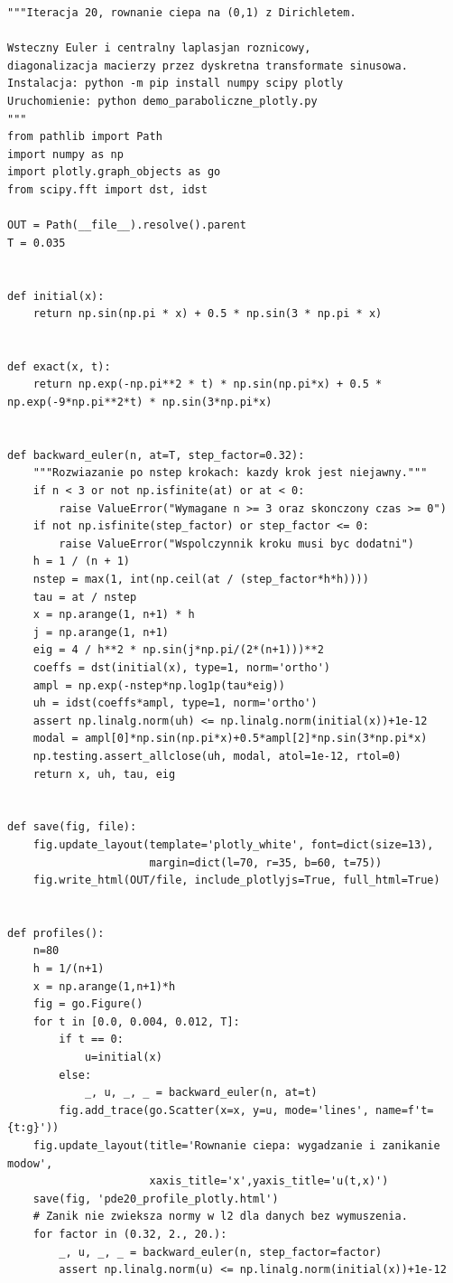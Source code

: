 \begin{lstlisting}[style=pythonpde,caption={Niejawny schemat cieplny, zbieżność i tłumienie modów (Plotly)},label={code:pde20-plotly}]
"""Iteracja 20, rownanie ciepa na (0,1) z Dirichletem.

Wsteczny Euler i centralny laplasjan roznicowy,
diagonalizacja macierzy przez dyskretna transformate sinusowa.
Instalacja: python -m pip install numpy scipy plotly
Uruchomienie: python demo_paraboliczne_plotly.py
"""
from pathlib import Path
import numpy as np
import plotly.graph_objects as go
from scipy.fft import dst, idst

OUT = Path(__file__).resolve().parent
T = 0.035


def initial(x):
    return np.sin(np.pi * x) + 0.5 * np.sin(3 * np.pi * x)


def exact(x, t):
    return np.exp(-np.pi**2 * t) * np.sin(np.pi*x) + 0.5 * np.exp(-9*np.pi**2*t) * np.sin(3*np.pi*x)


def backward_euler(n, at=T, step_factor=0.32):
    """Rozwiazanie po nstep krokach: kazdy krok jest niejawny."""
    if n < 3 or not np.isfinite(at) or at < 0:
        raise ValueError("Wymagane n >= 3 oraz skonczony czas >= 0")
    if not np.isfinite(step_factor) or step_factor <= 0:
        raise ValueError("Wspolczynnik kroku musi byc dodatni")
    h = 1 / (n + 1)
    nstep = max(1, int(np.ceil(at / (step_factor*h*h))))
    tau = at / nstep
    x = np.arange(1, n+1) * h
    j = np.arange(1, n+1)
    eig = 4 / h**2 * np.sin(j*np.pi/(2*(n+1)))**2
    coeffs = dst(initial(x), type=1, norm='ortho')
    ampl = np.exp(-nstep*np.log1p(tau*eig))
    uh = idst(coeffs*ampl, type=1, norm='ortho')
    assert np.linalg.norm(uh) <= np.linalg.norm(initial(x))+1e-12
    modal = ampl[0]*np.sin(np.pi*x)+0.5*ampl[2]*np.sin(3*np.pi*x)
    np.testing.assert_allclose(uh, modal, atol=1e-12, rtol=0)
    return x, uh, tau, eig


def save(fig, file):
    fig.update_layout(template='plotly_white', font=dict(size=13),
                      margin=dict(l=70, r=35, b=60, t=75))
    fig.write_html(OUT/file, include_plotlyjs=True, full_html=True)


def profiles():
    n=80
    h = 1/(n+1)
    x = np.arange(1,n+1)*h
    fig = go.Figure()
    for t in [0.0, 0.004, 0.012, T]:
        if t == 0:
            u=initial(x)
        else:
            _, u, _, _ = backward_euler(n, at=t)
        fig.add_trace(go.Scatter(x=x, y=u, mode='lines', name=f't={t:g}'))
    fig.update_layout(title='Rownanie ciepa: wygadzanie i zanikanie modow',
                      xaxis_title='x',yaxis_title='u(t,x)')
    save(fig, 'pde20_profile_plotly.html')
    # Zanik nie zwieksza normy w l2 dla danych bez wymuszenia.
    for factor in (0.32, 2., 20.):
        _, u, _, _ = backward_euler(n, step_factor=factor)
        assert np.linalg.norm(u) <= np.linalg.norm(initial(x))+1e-12



\end{lstlisting}
